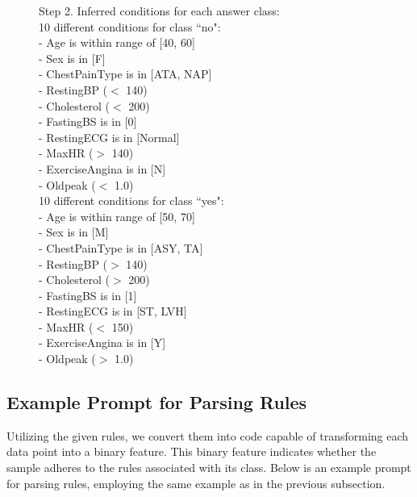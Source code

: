 \documentclass{article}
\theoremstyle{plain}
\theoremstyle{definition}
\theoremstyle{remark}
\begin{document}
\begin{figure}[ht!]
\begin{tcolorbox}[enhanced,attach boxed title to top center={yshift=-3mm,yshifttext=-1mm},
  colback=black!0!white, colframe=black!20!white, colbacktitle=black!10!white, coltitle=blue!20!black ]
{Step 2. Inferred conditions for each answer class: \\

10 different conditions for class ``no": \\
- Age is within range of [40, 60] \\
- Sex is in [F] \\
- ChestPainType is in [ATA, NAP] \\
- RestingBP ($<$ 140) \\
- Cholesterol ($<$ 200) \\
- FastingBS is in [0] \\
- RestingECG is in [Normal] \\
- MaxHR ($>$ 140) \\
- ExerciseAngina is in [N] \\
- Oldpeak ($<$ 1.0) \\

10 different conditions for class ``yes": \\
- Age is within range of [50, 70] \\
- Sex is in [M] \\
- ChestPainType is in [ASY, TA] \\
- RestingBP ($>$ 140) \\
- Cholesterol ($>$ 200) \\
- FastingBS is in [1] \\
- RestingECG is in [ST, LVH] \\
- MaxHR ($<$ 150) \\
- ExerciseAngina is in [Y] \\
- Oldpeak ($>$ 1.0) \\
}
\end{tcolorbox}
\label{fig:appendix-rule_outcome}            
\end{figure}

\newpage

\subsection{Example Prompt for Parsing Rules}
\label{sec:example_parsing}
Utilizing the given rules, we convert them into code capable of transforming each data point into a binary feature. This binary feature indicates whether the sample adheres to the rules associated with its class. Below is an example prompt for parsing rules, employing the same example as in the previous subsection.
\end{document}
